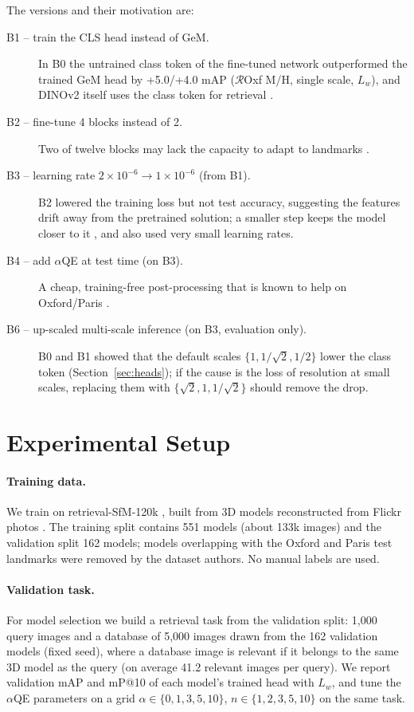 \documentclass[runningheads]{llncs}
\newcommand{\roxs}{$\mathcal{R}$Oxf}
\newcommand{\aqe}{$\alpha$QE}
\begin{document}
The versions and their motivation are:
\begin{description}
\item[B1 -- train the CLS head instead of GeM.] In B0 the untrained class
token of the fine-tuned network outperformed the trained GeM head by
+5.0/+4.0 mAP (\roxs{} M/H, single scale, $L_w$), and DINOv2 itself uses the
class token for retrieval \cite{oquab2024dinov2,elnouby2021vitretrieval}.
\item[B2 -- fine-tune 4 blocks instead of 2.] Two of twelve blocks may lack
the capacity to adapt to landmarks \cite{elnouby2021vitretrieval}.
\item[B3 -- learning rate $2\times10^{-6}\rightarrow1\times10^{-6}$ (from B1).]
B2 lowered the training loss but not test accuracy, suggesting the features
drift away from the pretrained solution; a smaller step keeps the model closer
to it \cite{kumar2022distort}, and \cite{radenovic2019gem} also used very small
learning rates.
\item[B4 -- add \aqe{} at test time (on B3).] A cheap, training-free
post-processing that is known to help on Oxford/Paris \cite{radenovic2019gem}.
\item[B6 -- up-scaled multi-scale inference (on B3, evaluation only).] B0 and
B1 showed that the default scales $\{1,1/\sqrt2,1/2\}$ lower the class token
(Section~\ref{sec:heads}); if the cause is the loss of resolution at small
scales, replacing them with $\{\sqrt2,1,1/\sqrt2\}$ should remove the drop.
\end{description}

\section{Experimental Setup}
\label{sec:setup}

\paragraph{Training data.}
We train on retrieval-SfM-120k \cite{radenovic2016cnn,radenovic2019gem}, built
from 3D models reconstructed from Flickr photos \cite{schonberger2015sfm}. The
training split contains 551 models (about 133k images) and the validation
split 162 models; models overlapping with the Oxford and Paris test landmarks
were removed by the dataset authors. No manual labels are used.

\paragraph{Validation task.}
For model selection we build a retrieval task from the validation split: 1,000
query images and a database of 5,000 images drawn from the 162 validation
models (fixed seed), where a database image is relevant if it belongs to the
same 3D model as the query (on average 41.2 relevant images per query). We
report validation mAP and mP@10 of each model's trained head with $L_w$, and
tune the \aqe{} parameters on a grid $\alpha\in\{0,1,3,5,10\}$,
$n\in\{1,2,3,5,10\}$ on the same task.
\end{document}
